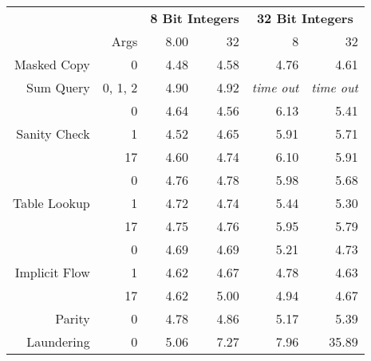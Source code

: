 \begin{table}[]
\centering
\begin{tabular}{rr|rr|rr}
                                   &         & \multicolumn{2}{c}{\textbf{8 Bit Integers}} & \multicolumn{2}{c}{\textbf{32 Bit Integers}}   \\
                                   & Args    & 8.00             & 32              & 8                 & 32                \\\hline\hline
Masked Copy                        & 0       & 4.48             & 4.58            & 4.76              & 4.61              \\\hline
Sum Query                          & 0, 1, 2 & 4.90             & 4.92            & \textit{time out} & \textit{time out} \\\hline
\multirow{3}{*}{Sanity Check}      & 0       & 4.64             & 4.56            & 6.13              & 5.41              \\
                                   & 1       & 4.52             & 4.65            & 5.91              & 5.71              \\
                                   & 17      & 4.60             & 4.74            & 6.10              & 5.91              \\\hline
\multirow{3}{*}{Table Lookup}      & 0       & 4.76             & 4.78            & 5.98              & 5.68              \\
                                   & 1       & 4.72             & 4.74            & 5.44              & 5.30               \\
                                   & 17      & 4.75             & 4.76            & 5.95              & 5.79              \\\hline
\multirow{3}{*}{Implicit Flow}     & 0       & 4.69             & 4.69            & 5.21              & 4.73              \\
                                   & 1       & 4.62             & 4.67            & 4.78              & 4.63              \\
                                   & 17      & 4.62             & 5.00            & 4.94              & 4.67              \\\hline\hline
Parity                             & 0       & 4.78             & 4.86            & 5.17              & 5.39              \\\hline
Laundering                         & 0       & 5.06             & 7.27            & 7.96              & 35.89             \\\hline

\end{tabular}
\end{table}

